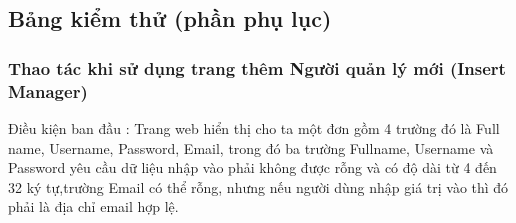 \documentclass[a4paper]{article}
\begin{document}
\subsection*{Bảng kiểm thử (phần phụ lục)}
\subsubsection*{Thao tác khi sử dụng trang thêm Người quản lý mới (Insert Manager)}

Điều kiện ban đầu : Trang web hiển thị cho ta một đơn gồm 4 trường đó là Full name, Username, Password, Email, trong đó ba trường Fullname, Username và Password yêu cầu dữ liệu nhập vào phải không được rỗng và có độ dài từ 4 đến 32 ký tự,trường Email có thể rỗng, nhưng nếu người dùng nhập giá trị vào thì đó phải là địa chỉ email hợp lệ.\newline
\end{document}
